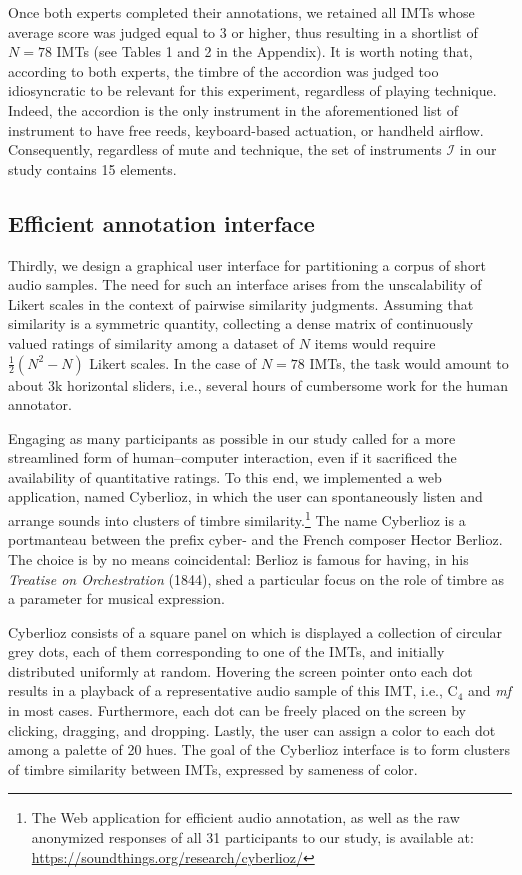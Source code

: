 \documentclass{bmcart}
\makeatletter
\newcommand*{\ie}{i.e.,\@\xspace}
\newcommand{\ja}[1]{\textcolor{purple}{JA: #1}\xspace}
\makeatother
\begin{document}
Once both experts completed their annotations, we retained all IMTs whose average score was judged equal to 3 or higher, thus resulting in a shortlist of $N=78$ IMTs (see Tables 1 and 2 in the Appendix).
It is worth noting that, according to both experts, the timbre of the accordion was judged too idiosyncratic to be relevant for this experiment, regardless of playing technique.
Indeed, the accordion is the only instrument in the aforementioned list of
instrument to have free reeds, keyboard-based actuation, or handheld airflow.
Consequently, regardless of mute and technique, the set of instruments $\mathcal{I}$ in our study contains 15 elements.

\subsection*{Efficient annotation interface}
Thirdly, we design a graphical user interface for partitioning a corpus of short audio samples.
The need for such an interface arises from the unscalability of Likert scales in the context of pairwise similarity judgments.
Assuming that similarity is a symmetric quantity, collecting a dense matrix of continuously valued ratings of similarity among a dataset of $N$ items would require $\frac{1}{2}(N^2-N)$ Likert scales.
In the case of $N=78$ IMTs, the task would amount to about 3k horizontal sliders, \ie{} several hours of cumbersome work for the human annotator. %

Engaging as many participants as possible in our study called for a more streamlined form of human--computer interaction, even if it sacrificed the availability of quantitative ratings.
To this end, we implemented a web application, named Cyberlioz, in which the user can spontaneously listen and arrange sounds into clusters of timbre similarity.\footnote{The Web application for efficient audio annotation, as well as the raw anonymized responses of all 31 participants to our study, is available at: \url{https://soundthings.org/research/cyberlioz/}}
The name Cyberlioz is a portmanteau between the prefix cyber- and the French composer Hector Berlioz.
The choice is by no means coincidental: Berlioz is famous for having, in his \emph{Treatise on Orchestration} (1844), shed a particular focus on the role of timbre as a parameter for musical expression.


Cyberlioz consists of a square panel on which is displayed a collection of circular grey dots, each of them corresponding to one of the IMTs, and initially distributed uniformly at random.
Hovering the screen pointer onto each dot results in a playback of a representative audio sample of this IMT, \ie{} $\mathrm{C}_4$ and \emph{mf} in most cases. Furthermore, each dot can be freely placed on the screen by clicking, dragging, and dropping.
Lastly, the user can assign a color to each dot among a palette of 20 hues.
The goal of the Cyberlioz interface is to form clusters of timbre similarity between IMTs, expressed by sameness of color.
\end{document}
